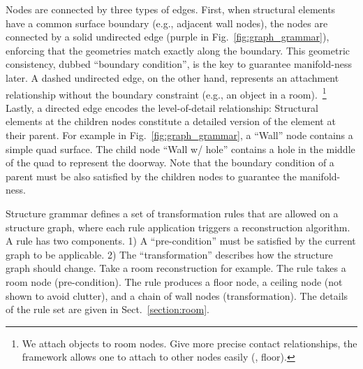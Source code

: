 Nodes are connected by three types of edges.
First, when structural elements have a common surface boundary (e.g.,
adjacent wall nodes), the nodes are connected by a solid undirected edge
(purple in Fig.~\ref{fig:graph_grammar}), enforcing that the geometries
match exactly along the boundary. This geometric consistency, dubbed
``boundary condition'', is the key to guarantee manifold-ness later. A
dashed undirected edge, on the other hand, represents an attachment
relationship without the boundary constraint (e.g., an object in a
room).~\footnote{We attach objects to room nodes. Give more precise
contact relationships, the framework allows one to attach to other nodes
easily (\eg, floor).}  Lastly, a directed edge encodes the
level-of-detail relationship: Structural elements at the children nodes
constitute a detailed version of the element at their parent. For
example in Fig.~\ref{fig:graph_grammar}, a ``Wall'' node contains a
simple quad surface. The child node ``Wall w/ hole''
contains a hole in the middle of the quad to represent the doorway.
Note that the boundary condition of a parent must be also satisfied by
the children nodes to guarantee the manifold-ness.

%


Structure grammar defines a set of transformation rules that are allowed
on a structure graph, where each rule application triggers a
reconstruction algorithm. A rule has two components. 1) A
``pre-condition'' must be satisfied by the current graph to be
applicable. 2) The ``transformation'' describes how the
structure graph should change.
%
Take a room reconstruction for example. The rule takes a room node
(pre-condition). The rule produces a floor node, a ceiling node (not
shown to avoid clutter), and a chain of wall nodes (transformation).
The details of the rule set are given in Sect.~\ref{section:room}.

